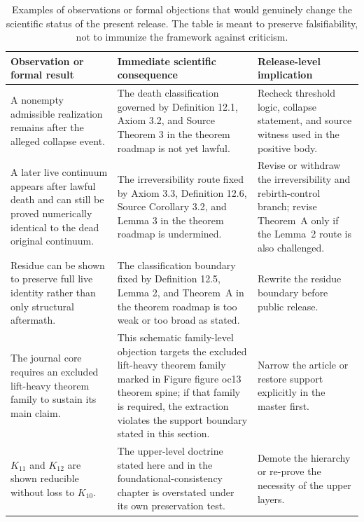 \begin{table}[htbp]
\centering
\begingroup
\footnotesize
\RaggedRight
\setlength{\tabcolsep}{4pt}
\begin{tabular}{@{}L{0.27\textwidth}L{0.36\textwidth}L{0.22\textwidth}@{}}
\toprule
\textbf{Observation or formal result} & \textbf{Immediate scientific consequence} & \textbf{Release-level implication} \\
\midrule
A nonempty admissible realization remains after the alleged collapse event. & The death classification governed by Definition 12.1, Axiom 3.2, and Source Theorem 3 in the theorem roadmap is not yet lawful. & Recheck threshold logic, collapse statement, and source witness used in the positive body. \\
A later live continuum appears after lawful death and can still be proved numerically identical to the dead original continuum. & The irreversibility route fixed by Axiom 3.3, Definition 12.6, Source Corollary 3.2, and Lemma 3 in the theorem roadmap is undermined. & Revise or withdraw the irreversibility and rebirth-control branch; revise Theorem~A only if the Lemma~2 route is also challenged. \\
Residue can be shown to preserve full live identity rather than only structural aftermath. & The classification boundary fixed by Definition 12.5, Lemma 2, and Theorem~A in the theorem roadmap is too weak or too broad as stated. & Rewrite the residue boundary before public release. \\
The journal core requires an excluded lift-heavy theorem family to sustain its main claim. & This schematic family-level objection targets the excluded lift-heavy theorem family marked in Figure figure oc13 theorem spine; if that family is required, the extraction violates the support boundary stated in this section. & Narrow the article or restore support explicitly in the master first. \\
\(K_{11}\) and \(K_{12}\) are shown reducible without loss to \(K_{10}\). & The upper-level doctrine stated here and in the foundational-consistency chapter is overstated under its own preservation test. & Demote the hierarchy or re-prove the necessity of the upper layers. \\
\bottomrule
\end{tabular}
\endgroup
\caption{Examples of observations or formal objections that would genuinely change the scientific
status of the present release. The table is meant to preserve falsifiability, not to immunize the
framework against criticism.}
\label{tab:oc13-counterexamples}
\end{table}

